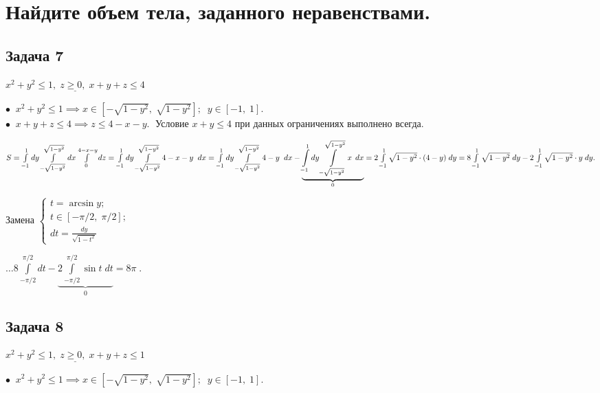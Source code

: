 \documentclass[a4paper, fleqn]{article}
\begin{document}
    \section*{Найдите объем тела, заданного неравенствами.}

    \subsection*{Задача 7}

    $\underline{x^2 + y^2 \leq 1, \; z \geq 0, \; x + y + z \leq 4}$

    $\bullet \; \; x^2 + y^2 \leq 1 \implies x \in \left[-\sqrt{1 - y^2}, \; \sqrt{1 - y^2}\right]; \; \; y \in [-1, \; 1].$\\

    $\bullet \; \; x + y + z \leq 4 \implies z \leq 4 - x - y. \; $ Условие $x + y \leq 4$ при данных ограничениях выполнено всегда.

    $S = \int\limits_{-1}^{1}  dy \int\limits_{-\sqrt{1 - y^2}}^{\sqrt{1 - y^2}} dx \int\limits_{0}^{4 -x - y} dz =  \int\limits_{-1}^{1}  dy \int\limits_{-\sqrt{1 - y^2}}^{\sqrt{1 - y^2}} 4 -x - y \; \;  dx =  \int\limits_{-1}^{1}  dy \int\limits_{-\sqrt{1 - y^2}}^{\sqrt{1 - y^2}} 4 - y \; \; dx -  \underbrace{\int\limits_{-1}^{1}  dy \int\limits_{-\sqrt{1 - y^2}}^{\sqrt{1 - y^2}} x \, \; dx}_{0} = \\
    2 \int\limits_{-1}^{1}  \sqrt{1 - y^2} \cdot (4 - y) \;  dy =
    8 \int\limits_{-1}^{1}  \sqrt{1 - y^2}  \;  dy - 2 \int\limits_{-1}^{1}  \sqrt{1 - y^2} \cdot  y \;  dy .$

    Замена $\begin{cases}
    t = \arcsin y;\\
    t \in \left[-\pi/2 , \; \pi/2\right];\\
    dt = \frac{dy}{\sqrt{1 - t^2}}
    \end{cases}$

    $\dots \displaystyle 8 \int\limits_{-\pi /2}^{\pi/2} dt - \underbrace{2 \int\limits_{-\pi /2}^{\pi/2} \sin t \; dt}_{0} = \boxed{8 \pi} \; . $



    \subsection*{Задача 8}

    $\underline{x^2 + y^2 \leq 1, \; z \geq 0, \; x + y + z \leq 1}$

    $\bullet \; \; x^2 + y^2 \leq 1 \implies x \in \left[-\sqrt{1 - y^2}, \; \sqrt{1 - y^2}\right]; \; \; y \in [-1, \; 1].$\\
\end{document}

